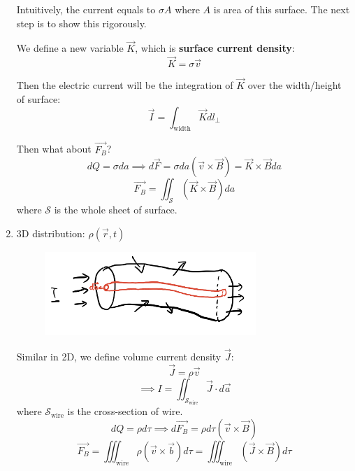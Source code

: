 \documentclass[12pt,a4paper,twoside]{article}
\numberwithin{equation}{section}
\begin{document}
\begin{enumerate}
        Intuitively, the current equals to $\sigma A$ where $A$ is area of this surface. The next step is to show this rigorously.
        
        We define a new variable $\overrightarrow{K}$, which is \textbf{surface current density}:
        \[\overrightarrow{K}=\sigma \overrightarrow{v}\]
        
        Then the electric current will be the integration of $\overrightarrow{K}$ over the width/height of surface:
        \begin{equation*}
            \boxed{\overrightarrow{I}=\int_{\mathrm{width}} \overrightarrow{K}dl_\perp}
        \end{equation*}
        
        Then what about $\overrightarrow{F_B}$?
        \[dQ=\sigma da\implies d\overrightarrow{F}=\sigma da(\overrightarrow{v}\times \overrightarrow{B})=\overrightarrow{K}\times \overrightarrow{B}da\]
        \begin{equation}
            \boxed{\overrightarrow{F_B} = \iint_{\mathcal{S}}(\overrightarrow{K}\times \overrightarrow{B})da}
        \end{equation}
        where $\mathcal{S}$ is the whole sheet of surface.
        
        \item 3D distribution: $\rho(\overrightarrow{r}, t)$
        \begin{figure}[ht]
            \centering
            \includegraphics[width=8cm]{250-Revision/current-3d.png}
        \end{figure}
        
        Similar in 2D, we define  volume current density $\overrightarrow{J}$:
        \[\overrightarrow{J}=\rho\overrightarrow{v}\]
        \[\implies \boxed{I=\iint_{\mathcal{S}_\mathrm{wire}}\overrightarrow{J}\cdot d\overrightarrow{a}}\]
        where $\mathcal{S_{\mathrm{wire}}}$ is the cross-section of wire.
        \[dQ=\rho d\tau\implies d\overrightarrow{F_B}=\rho d\tau(\overrightarrow{v}\times \overrightarrow{B})\]
        \begin{equation}
            \boxed{\overrightarrow{F_B}=\iiint_{\mathrm{wire}}\rho(\overrightarrow{v}\times \overrightarrow{b})d\tau=\iiint_{\mathrm{wire}}(\overrightarrow{J}\times \overrightarrow{B})d\tau}
        \end{equation}
    \end{enumerate}
    
\end{document}
